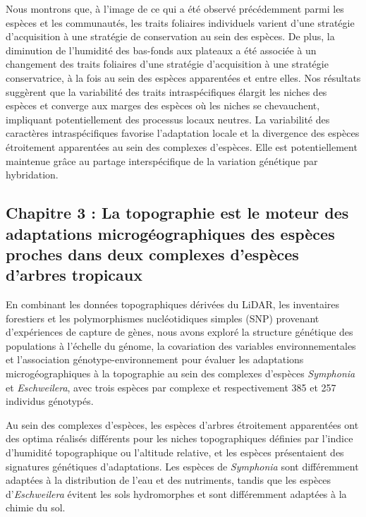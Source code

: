 \documentclass[12pt,twoside,a4paper, a]{article}
\begin{document}
Nous montrons que, à l'image de ce qui a été observé précédemment parmi les espèces et les communautés, les traits foliaires individuels varient d'une stratégie d'acquisition à une stratégie de conservation au sein des espèces. De plus, la diminution de l'humidité des bas-fonds aux plateaux a été associée à un changement des traits foliaires d'une stratégie d'acquisition à une stratégie conservatrice, à la fois au sein des espèces apparentées et entre elles. Nos résultats suggèrent que la variabilité des traits intraspécifiques élargit les niches des espèces et converge aux marges des espèces où les niches se chevauchent, impliquant potentiellement des processus locaux neutres. La variabilité des caractères intraspécifiques favorise l'adaptation locale et la divergence des espèces étroitement apparentées au sein des complexes d'espèces. Elle est potentiellement maintenue grâce au partage interspécifique de la variation génétique par hybridation.

\hypertarget{chapitre-3-la-topographie-est-le-moteur-des-adaptations-microguxe9ographiques-des-espuxe8ces-proches-dans-deux-complexes-despuxe8ces-darbres-tropicaux}{%
\subsection{Chapitre 3 : La topographie est le moteur des adaptations microgéographiques des espèces proches dans deux complexes d'espèces d'arbres tropicaux}\label{chapitre-3-la-topographie-est-le-moteur-des-adaptations-microguxe9ographiques-des-espuxe8ces-proches-dans-deux-complexes-despuxe8ces-darbres-tropicaux}}

En combinant les données topographiques dérivées du LiDAR, les inventaires forestiers et les polymorphismes nucléotidiques simples (SNP) provenant d'expériences de capture de gènes, nous avons exploré la structure génétique des populations à l'échelle du génome, la covariation des variables environnementales et l'association génotype-environnement pour évaluer les adaptations microgéographiques à la topographie au sein des complexes d'espèces \emph{Symphonia} et \emph{Eschweilera}, avec trois espèces par complexe et respectivement 385 et 257 individus génotypés.

Au sein des complexes d'espèces, les espèces d'arbres étroitement apparentées ont des optima réalisés différents pour les niches topographiques définies par l'indice d'humidité topographique ou l'altitude relative, et les espèces présentaient des signatures génétiques d'adaptations. Les espèces de \emph{Symphonia} sont différemment adaptées à la distribution de l'eau et des nutriments, tandis que les espèces d'\emph{Eschweilera} évitent les sols hydromorphes et sont différemment adaptées à la chimie du sol.
\end{document}
